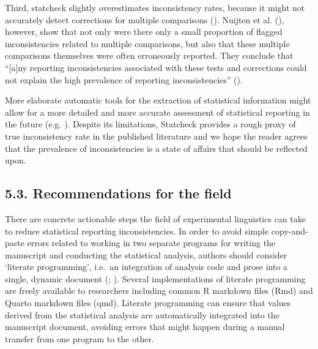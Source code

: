 \documentclass[
  doc,
  longtable,
  nolmodern,
  notxfonts,
  notimes,
  colorlinks=true,linkcolor=blue,citecolor=blue,urlcolor=blue]{apa7}
\begin{document}
Third, statcheck slightly overestimates inconsistency rates, because it
might not accurately detect corrections for multiple comparisons
(). Nuijten et al.
(), however, show that not only
were there only a small proportion of flagged inconsistencies related to
multiple comparisons, but also that these multiple comparisons
themselves were often erroneously reported. They conclude that
``{[}a{]}ny reporting inconsistencies associated with these tests and
corrections could not explain the high prevalence of reporting
inconsistencies'' ().

More elaborate automatic tools for the extraction of statistical
information might allow for a more detailed and more accurate assessment
of statistical reporting in the future (e.g.
). Despite its
limitations, Statcheck provides a rough proxy of true inconsistency rate
in the published literature and we hope the reader agrees that the
prevalence of inconsistencies is a state of affairs that should be
reflected upon.

\subsection{5.3. Recommendations for the
field}\label{recommendations-for-the-field}

There are concrete actionable steps the field of experimental
linguistics can take to reduce statistical reporting inconsistencies. In
order to avoid simple copy-and-paste errors related to working in two
separate programs for writing the manuscript and conducting the
statistical analysis, authors should consider `literate programming',
i.e.~an integration of analysis code and prose into a single, dynamic
document (;
). Several implementations
of literate programming are freely available to researchers including
common R markdown files (Rmd) and Quarto markdown files (qmd). Literate
programming can ensure that values derived from the statistical analysis
are automatically integrated into the manuscript document, avoiding
errors that might happen during a manual transfer from one program to
the other.
\end{document}
